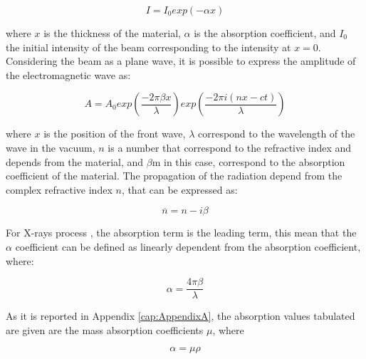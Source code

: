\begin{equation}
I = I_0 exp(-\alpha x)
\label{eq: intensity}
\end{equation}

\begin{flushleft}
where $x $ is the thickness of the material, $\alpha$ is the absorption coefficient, and $I_0$ the initial intensity of the beam corresponding to the intensity at $x=0$. Considering the beam as   a plane wave, it is possible to express the  amplitude of the electromagnetic wave as:
\end{flushleft}

\begin{equation}
A=A_0exp(\frac{-2 \pi \beta x}{\lambda})exp(\frac{-2 \pi i (nx-ct)}{\lambda})
\label{eq: amplitude}
\end{equation}

\begin{flushleft}
where $x$ is the position of the front wave, $\lambda$ correspond to the wavelength of the wave in the vacuum, $n $ is a number that correspond to the refractive index and depends from the material, and $\beta $m in this case, correspond to the absorption coefficient of the material. The propagation of the radiation depend from the complex refractive index $n $, that can be expressed as: 
\end{flushleft}

\begin{equation}
\overline{n} = n - i \beta
\label{eq: n_comlex}
\end{equation}

\begin{flushleft}
For X-rays process , the absorption term is the leading term, this mean that the $\alpha$ coefficient can be defined as linearly dependent from the absorption coefficient, where:
\end{flushleft}

\begin{equation}
\alpha = \frac{4 \pi \beta}{\lambda}
\label{eq: alpha1}
\end{equation}

\begin{flushleft}
As it is reported in Appendix \ref{cap:AppendixA}, the absorption values tabulated are given are the mass absorption coefficients $\mu$, where
\end{flushleft}

\begin{equation}
\alpha = \mu \rho
\label{eq: alpha2}
\end{equation}

